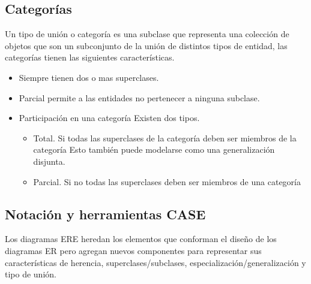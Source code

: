 \documentclass[12pt, titlepage]{article}
\begin{document}
    \subsection{Categorías}
    Un tipo de unión o categoría es una subclase que representa una colección de objetos que son un subconjunto de la unión de distintos tipos de entidad, las categorías tienen las siguientes características.\cite{LIBRO}
    \begin{itemize}
        \item Siempre tienen dos o mas superclases.
        \item Parcial permite a las entidades no pertenecer a ninguna subclase.
        \item Participación en una categoría Existen dos tipos.
        \begin{itemize}
            \item Total. Si todas las superclases de la categoría deben ser miembros de la categoría Esto también puede modelarse como una generalización disjunta.
            \item Parcial. Si no todas las superclases deben ser miembros de una categoría
        \end{itemize}
    \end{itemize}
    \subsection{Notación y herramientas CASE}
    Los diagramas ERE heredan los elementos que conforman el diseño de los diagramas ER pero agregan nuevos componentes para representar sus características de herencia, superclases/subclases, especialización/generalización y tipo de unión.
    
\end{document}
